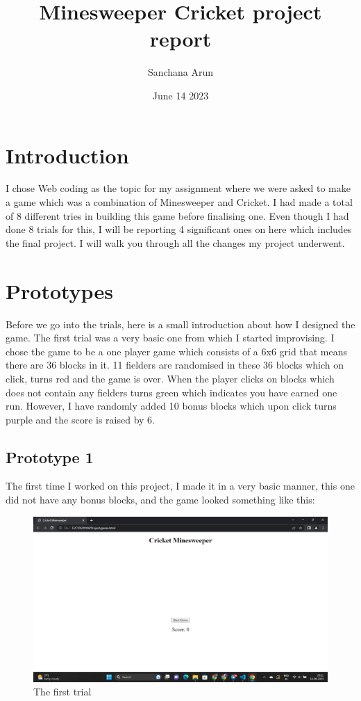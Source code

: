 \documentclass{article}
\title{Minesweeper Cricket project report}
\author{Sanchana Arun }
\date{June 14 2023}
\begin{document}
\maketitle
\section{Introduction}
I chose Web coding as the topic for my assignment where we were asked to make a game which was a combination of Minesweeper and Cricket. I had made a total of 8 different tries in building this game before finalising one. Even though I had done 8 trials for this, I will be reporting 4 significant ones on here which includes the final project. I will walk you through all the changes my project underwent.
\maketitle
\section{Prototypes} Before we go into the trials, here is a small introduction about how I designed the game.
The first trial was a very basic one from which I started improvising. I chose the game to be a one player game which consists of a 6x6 grid that means there are 36 blocks in it. 11 fielders are randomised in these 36 blocks which on click, turns red and the game is over. When the player clicks on blocks which does not contain any fielders turns green which indicates you have earned one run. However, I have randomly added 10 bonus blocks which upon click turns purple and the score is raised by 6.
\maketitle
\subsection{Prototype 1}
The first time I worked on this project, I made it in a very basic manner, this one did not have any bonus blocks, and the game looked something like this:
\begin{figure}
[H]
   \includegraphics[width=\linewidth]{Screenshot (217).png}
   \caption{The first trial}
\end{figure}
\end{document}

